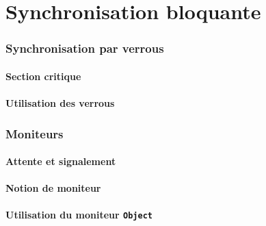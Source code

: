\documentclass[9pt, handout]{beamer}
\begin{document}
 
\part{Synchronisation bloquante}
 
 
\section{Synchronisation par verrous}
 
\subsection{Section critique}







 
\subsection{Utilisation des verrous}









 
\section{Moniteurs}
 
\subsection{Attente et signalement}



 
\subsection{Notion de moniteur}




 
\subsection{Utilisation du moniteur \lstinline{Object}}



 
\end{document}
